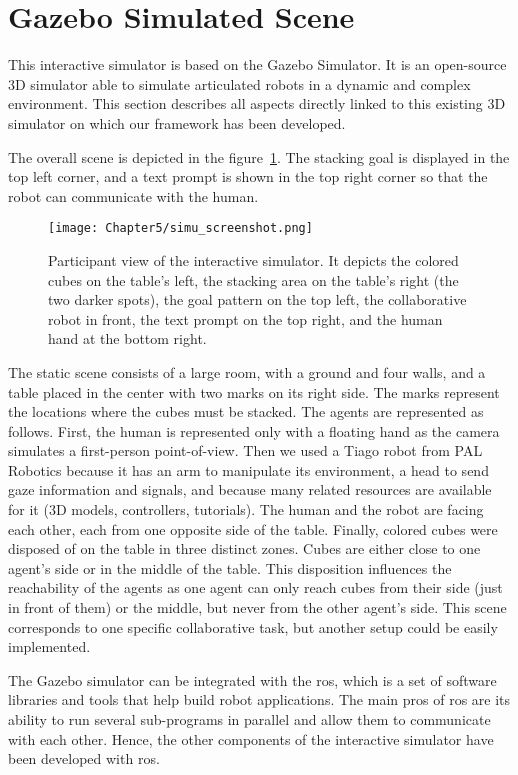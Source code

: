 \section{Gazebo Simulated Scene}

This interactive simulator is based on the Gazebo Simulator. It is an open-source 3D simulator able to simulate articulated robots in a dynamic and complex environment.
This section describes all aspects directly linked to this existing 3D simulator on which our framework has been developed.

The overall scene is depicted in the figure~\ref{fig:simu_view}. The stacking goal is displayed in the top left corner, and a text prompt is shown in the top right corner so that the robot can communicate with the human.

\begin{figure}[h]
    \centering
    \texttt{[image: Chapter5/simu\_screenshot.png]}
    \caption{Participant view of the interactive simulator. It depicts the colored cubes on the table's left, the stacking area on the table's right (the two darker spots), the goal pattern on the top left, the collaborative robot in front, the text prompt on the top right, and the human hand at the bottom right.}
    \label{fig:simu_view}
\end{figure}

The static scene consists of a large room, with a ground and four walls, and a table placed in the center with two marks on its right side. The marks represent the locations where the cubes must be stacked. The agents are represented as follows. First, the human is represented only with a floating hand as the camera simulates a first-person point-of-view. Then we used a Tiago robot from PAL Robotics because it has an arm to manipulate its environment, a head to send gaze information and signals, and because many related resources are available for it (3D models, controllers, tutorials). The human and the robot are facing each other, each from one opposite side of the table. Finally, colored cubes were disposed of on the table in three distinct zones. Cubes are either close to one agent's side or in the middle of the table. This disposition influences the reachability of the agents as one agent can only reach cubes from their side (just in front of them) or the middle, but never from the other agent's side. This scene corresponds to one specific collaborative task, but another setup could be easily implemented. 

The Gazebo simulator can be integrated with the \acrfull{ros}, which is a set of software libraries and tools that help build robot applications. The main pros of \acrshort{ros} are its ability to run several sub-programs in parallel and allow them to communicate with each other. Hence, the other components of the interactive simulator have been developed with \acrshort{ros}.


